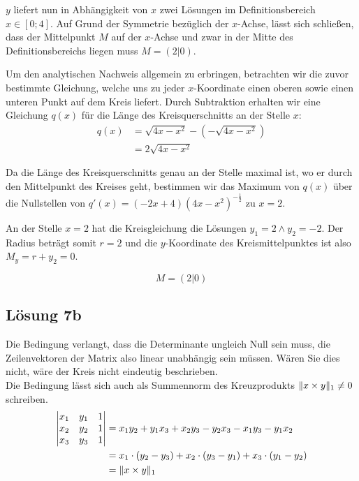 \documentclass[main.tex]{subfiles}
\begin{document}
$y$ liefert nun in Abhängigkeit von $x$ zwei Lösungen im Definitionsbereich $x \in [0;4]$.
Auf Grund der Symmetrie bezüglich der $x$-Achse, lässt sich schließen, dass der Mittelpunkt $M$ auf der $x$-Achse und zwar in der Mitte des Definitionsbereichs liegen muss $M=(2|0)$.

Um den analytischen Nachweis allgemein zu erbringen, betrachten wir die zuvor bestimmte Gleichung, welche uns zu jeder $x$-Koordinate einen oberen sowie einen unteren Punkt auf dem Kreis liefert. Durch Subtraktion erhalten wir eine Gleichung $q(x)$ für die Länge des Kreisquerschnitts an der Stelle $x$:
\begin{align*}
    q(x) &= \sqrt{4x - x^2} - \left(-\sqrt{4x - x^2}\right)\\
         &= 2\sqrt{4x - x^2}
\end{align*}

Da die Länge des Kreisquerschnitts genau an der Stelle maximal ist, wo er durch den Mittelpunkt des Kreises geht, bestimmen wir das Maximum von $q(x)$ über die Nullstellen von $q'(x)=(-2x+4)(4x-x^2)^{-\frac{1}{2}}$ zu $x=2$.

An der Stelle $x=2$ hat die Kreisgleichung die Lösungen $y_1=2 \land y_2=-2$. Der Radius beträgt somit $r=2$ und die $y$-Koordinate des Kreismittelpunktes ist also $M_y = r + y_2 = 0$.

$$
    M = (2|0)
$$

\subsection{Lösung 7b}
Die Bedingung verlangt, dass die Determinante ungleich Null sein muss,
die Zeilenvektoren der Matrix also linear unabhängig sein müssen.
Wären Sie dies nicht, wäre der Kreis nicht eindeutig beschrieben. \\

\textcolor{Cerulean}{
Die Bedingung lässt sich auch als Summennorm des Kreuzprodukts $\lVert x \times y\rVert_1 \neq 0$ schreiben.
\begin{align*}
    \begin{vmatrix}
        x_1 & y_1 & 1 \\
        x_2 & y_2 & 1 \\
        x_3 & y_3 & 1 \\
    \end{vmatrix}
    &= x_1y_2 + y_1x_3 + x_2y_3 - y_2x_3 - x_1y_3 - y_1x_2 \\
    &= x_1\cdot (y_2-y_3) + x_2\cdot (y_3-y_1) + x_3\cdot (y_1-y_2)\\
    &= \lVert x \times y\rVert_1
\end{align*}
}
\end{document}
